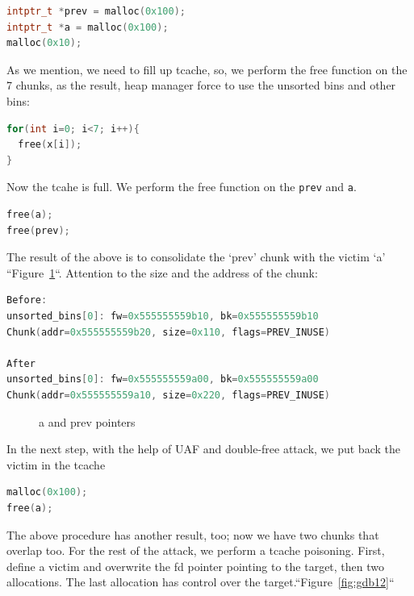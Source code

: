 \documentclass{masterthesis}
\newcommand*\tch{tcache}
\newcommand*\ub{unsorted bins}
\begin{document}
\begin{lstlisting}[language=c,frame=tlrb]
intptr_t *prev = malloc(0x100);
intptr_t *a = malloc(0x100);
malloc(0x10);
\end{lstlisting}

As we mention, we need to fill up \tch{}, so, we perform the free function on the 7 chunks, as the result, heap manager force to use the \ub{} and other bins:

\begin{lstlisting}[language=c,frame=tlrb]
for(int i=0; i<7; i++){
  free(x[i]);
}
\end{lstlisting}

Now the tcahe is full. We perform the free function on the \lstinline{prev} and \lstinline{a}.

\begin{lstlisting}[language=c,frame=tlrb]
free(a);
free(prev);
\end{lstlisting}

The result of the above is to consolidate the ‘prev’ chunk with the victim ‘a’ ``Figure~\ref{fig:gdb11}``. Attention to the size and the address of the chunk:

\begin{lstlisting}[language=c,frame=tlrb]
Before:
unsorted_bins[0]: fw=0x555555559b10, bk=0x555555559b10
Chunk(addr=0x555555559b20, size=0x110, flags=PREV_INUSE)

After
unsorted_bins[0]: fw=0x555555559a00, bk=0x555555559a00
Chunk(addr=0x555555559a10, size=0x220, flags=PREV_INUSE)
 \end{lstlisting}

\begin{figure}[h!]
 \caption{a and prev pointers}
 \label{fig:gdb11}
\end{figure}

In the next step, with the help of UAF and double-free attack, we put back the victim in the \tch{}

\begin{lstlisting}[language=c,frame=tlrb]
malloc(0x100);
free(a);
\end{lstlisting}

The above procedure has another result, too; now we have two chunks that overlap too. For the rest of the attack, we perform a \tch{} poisoning. First, define a victim and overwrite the fd pointer pointing to the target, then two allocations. The last allocation has control over the target.``Figure~\ref{fig:gdb12}``
\end{document}

